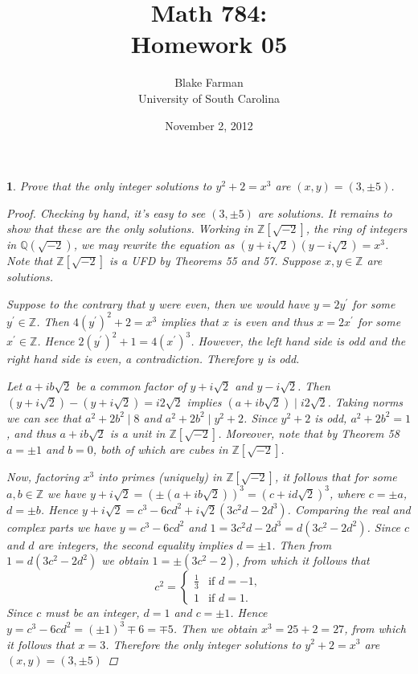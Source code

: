 \documentclass[10pt]{amsart}
\author{Blake Farman\\University of South Carolina}
\title{Math 784:\\Homework 05}
\date{November 2, 2012}
\begin{document}
\maketitle

\newtheorem{thm}{}

\begin{thm}
  Prove that the only integer solutions to $y^2 + 2 = x^3$ are $(x,y) = (3,\pm5)$.
  
  \begin{proof}
    Checking by hand, it's easy to see $(3, \pm5)$ are solutions.
    It remains to show that these are the only solutions.
    Working in $\mathbb{Z}[\sqrt{-2}]$, the ring of integers in $\mathbb{Q}(\sqrt{-2})$, we may rewrite the equation as $(y + i\sqrt{2})(y - i\sqrt{2}) = x^3$.
    Note that $\mathbb{Z}[\sqrt{-2}]$ is a UFD by Theorems 55 and 57.
    Suppose $x,y \in \mathbb{Z}$ are solutions.
    
    Suppose to the contrary that $y$ were even, then we would have $y = 2y^\prime$ for some $y^\prime \in \mathbb{Z}$.
    Then $4(y^\prime)^2 + 2 = x^3$ implies that $x$ is even and thus $x = 2x^\prime$ for some $x^\prime \in \mathbb{Z}$.
    Hence $2(y^\prime)^2 + 1 = 4(x^\prime)^3$.
    However, the left hand side is odd and the right hand side is even, a contradiction.
    Therefore $y$ is odd.
    
    Let $a + ib\sqrt{2}$ be a common factor of $y + i\sqrt{2}$ and $y - i\sqrt{2}$.
    Then $(y + i\sqrt{2}) - (y + i\sqrt{2}) = i2\sqrt{2}$ implies $(a + ib\sqrt{2}) \mid i2\sqrt{2}$.
    Taking norms we can see that $a^2 + 2b^2 \mid 8$ and $a^2 + 2b^2 \mid y^2 + 2$.
    Since $y^2 + 2$ is odd, $a^2 + 2b^2 = 1$, and thus $a + ib\sqrt{2}$ is a unit in $\mathbb{Z}[\sqrt{-2}]$.
    Moreover, note that by Theorem 58 $a = \pm 1$ and $b = 0$, both of which are cubes in $\mathbb{Z}[\sqrt{-2}]$.
    
    Now, factoring $x^3$ into primes (uniquely) in $\mathbb{Z}[\sqrt{-2}]$, it follows that for some $a,b \in \mathbb{Z}$ we have $y + i\sqrt{2} = (\pm(a +ib\sqrt{2}))^3 = (c + id\sqrt{2})^3$, where $c = \pm a$, $d = \pm b$.
    Hence $y + i\sqrt{2} = c^3 - 6cd^2 + i\sqrt{2}(3c^2d - 2d^3)$.
    Comparing the real and complex parts we have $y = c^3 - 6cd^2$ and $1 = 3c^2d - 2d^3 = d(3c^2 - 2d^2)$.
    Since $c$ and $d$ are integers, the second equality implies $d = \pm 1$.
    Then from $1 = d(3c^2 - 2d^2)$ we obtain $1 = \pm(3c^2 - 2)$, from which it follows that 
    $$c^2 = \left\{ 
    \begin{array}{ll}
      \frac{1}{3} & \text{if } d = -1,\\
      1 & \text{if } d = 1.
    \end{array}
    \right.$$
    Since $c$ must be an integer, $d = 1$ and $c = \pm 1$.
    Hence $y = c^3 - 6cd^2 =(\pm 1)^3 \mp 6 = \mp 5$.
    Then we obtain $x^3 = 25 + 2 = 27$, from which it follows that $x = 3$.
    Therefore the only integer solutions to $y^2 + 2 = x^3$ are $(x,y) = (3,\pm 5)$
  \end{proof}
\end{thm}
\end{document}
